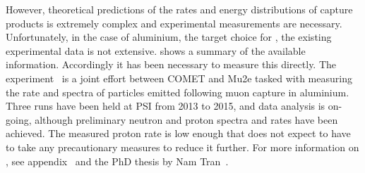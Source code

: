 However, theoretical predictions of the rates and energy distributions of capture products is extremely complex and experimental measurements are necessary.
Unfortunately, in the case of aluminium, the target choice for \COMET, the existing experimental data is not extensive.
 shows a summary of the available information.  
Accordingly it has been necessary to measure this directly.
The \alcap experiment~\cite{AlcapProposal2012} is a joint effort between COMET and Mu2e tasked with measuring the rate and spectra of particles emitted following muon capture in aluminium.
Three runs have been held at \ac{PSI} from 2013 to 2015, and data analysis is on-going, although preliminary neutron and proton spectra and rates have been achieved.
The measured proton rate is low enough that \COMET does not expect to have to take any precautionary measures to reduce it further.
For more information on \alcap, see appendix~ and the PhD thesis by Nam Tran~\cite{NamThesis}.
